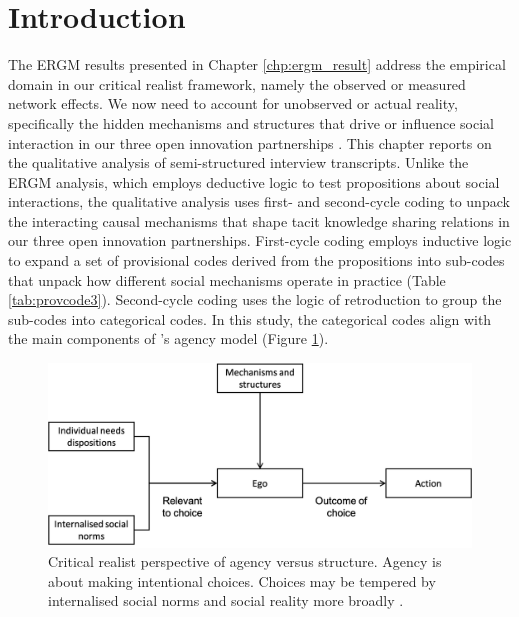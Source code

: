 \section{Introduction}

The ERGM results presented in Chapter \ref{chp:ergm_result} address the empirical domain in our critical realist framework, namely the observed or measured network effects. We now need to account for unobserved or actual reality, specifically the hidden mechanisms and structures that drive or influence social interaction in our three open innovation partnerships \citep{welch2011theorising, mcavoy2018critical, haigh2019developing}. This chapter reports on the qualitative analysis of semi-structured interview transcripts. Unlike the ERGM analysis, which employs deductive logic to test propositions about social interactions, the qualitative analysis uses first- and second-cycle coding to unpack the interacting causal mechanisms that shape tacit knowledge sharing relations in our three open innovation partnerships. First-cycle coding employs inductive logic to expand a set of provisional codes derived from the propositions into sub-codes that unpack how different social mechanisms operate in practice (Table \ref{tab:provcode3}). Second-cycle coding uses the logic of retroduction to group the sub-codes into categorical codes. In this study, the categorical codes align with the main components of \citeauthor{loyal2001agency}'s \citeyearpar{loyal2001agency} agency model (Figure \ref{fig:agency_structure3}). \medskip

\begin{figure}[hbt!]
    \centering
    \includegraphics[width = \textwidth]{Images/agency_structure_loyal.png}
    \caption[]{Critical realist perspective of agency versus structure. Agency is about making intentional choices. Choices may be tempered by internalised social norms and social reality more broadly \citep{loyal2001agency}.}
    \label{fig:agency_structure3}
\end{figure}

